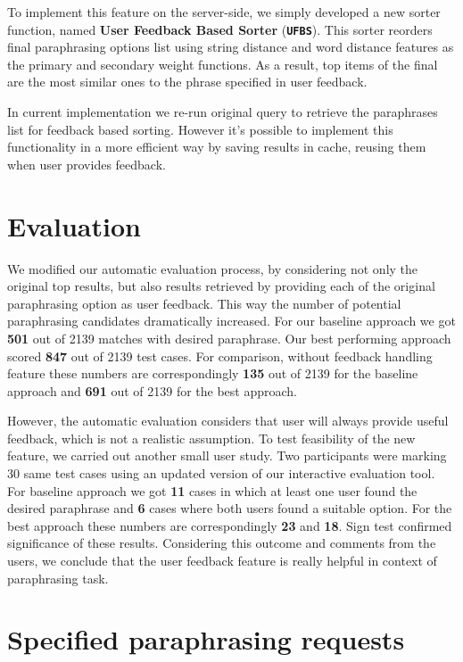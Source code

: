 To implement this feature on the server-side, we simply developed a new sorter function, named \textbf{User Feedback Based Sorter} (\texttt{\textbf{UFBS}}). This sorter reorders final paraphrasing options list using string distance and word distance features as the primary and secondary weight functions. As a result, top items of the final are the most similar ones to the phrase specified in user feedback. 

In current implementation we re-run original query to retrieve the paraphrases list for feedback based sorting. However it's possible to implement this functionality in a more efficient way by saving results in cache, reusing them when user provides feedback. 

\section{Evaluation}

We modified our automatic evaluation process, by considering not only the original top results, but also results retrieved by providing each of the original paraphrasing option as user feedback. This way the number of potential paraphrasing candidates dramatically increased. For our baseline approach we got \textbf{501} out of 2139 matches with desired paraphrase. Our best performing approach scored \textbf{847} out of 2139 test cases. For comparison, without feedback handling feature these numbers are correspondingly \textbf{135} out of 2139 for the baseline approach and \textbf{691} out of 2139 for the best approach.

However, the automatic evaluation considers that user will always provide useful feedback, which is not a realistic assumption. To test feasibility of the new feature, we carried out another small user study. Two participants were marking 30 same test cases using an updated version of our interactive evaluation tool. For baseline approach we got \textbf{11} cases in which at least one user found the desired paraphrase and \textbf{6} cases where both users found a suitable option. For the best approach these numbers are correspondingly \textbf{23} and \textbf{18}. Sign test confirmed significance of these results. Considering this outcome and comments from the users, we conclude that the user feedback feature is really helpful in context of paraphrasing task.

\section{Specified paraphrasing requests}

